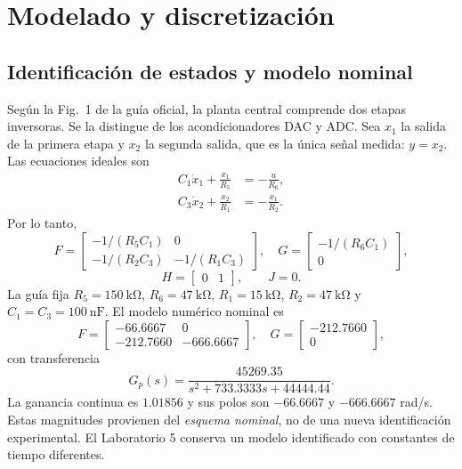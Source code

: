 \section{Modelado y discretización}
\subsection{Identificación de estados y modelo nominal}
Según la Fig.~1 de la guía oficial, la planta central comprende dos
etapas inversoras. Se la distingue de los acondicionadores DAC y ADC.
Sea $x_1$ la salida de la primera etapa y $x_2$ la segunda salida,
que es la única señal medida: $y=x_2$. Las ecuaciones ideales son
\begin{align}
C_1\dot x_1+\frac{x_1}{R_5}&=-\frac{u}{R_6},\\
C_3\dot x_2+\frac{x_2}{R_1}&=-\frac{x_1}{R_2}.
\end{align}
Por lo tanto,
\begin{equation}
F=\begin{bmatrix}-1/(R_5C_1)&0\\-1/(R_2C_3)&-1/(R_1C_3)\end{bmatrix},\quad
G=\begin{bmatrix}-1/(R_6C_1)\\0\end{bmatrix},
\end{equation}
\begin{equation}
H=\begin{bmatrix}0&1\end{bmatrix},\qquad J=0.
\end{equation}
La guía fija $R_5=\SI{150}{\kilo\ohm}$, $R_6=\SI{47}{\kilo\ohm}$,
$R_1=\SI{15}{\kilo\ohm}$, $R_2=\SI{47}{\kilo\ohm}$ y
$C_1=C_3=\SI{100}{\nano\farad}$. El modelo numérico nominal es
\begin{equation}
F=\begin{bmatrix}-66.6667&0\\-212.7660&-666.6667\end{bmatrix},\quad
G=\begin{bmatrix}-212.7660\\0\end{bmatrix},
\end{equation}
con transferencia
\begin{equation}
G_p(s)=\frac{45269.35}{s^2+733.3333s+44444.44}.
\end{equation}
La ganancia continua es $1.01856$ y sus polos son $-66.6667$ y
$-666.6667$ rad/s. Estas magnitudes provienen del \emph{esquema nominal},
no de una nueva identificación experimental. El Laboratorio 5
conserva un modelo identificado con constantes de tiempo diferentes.

